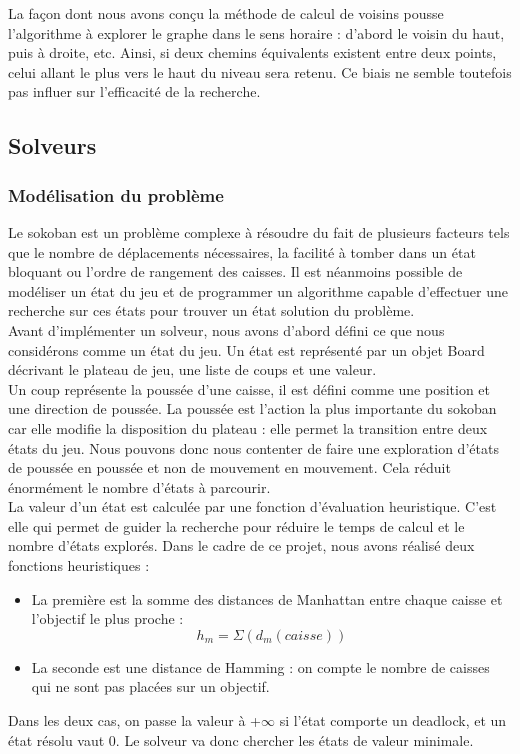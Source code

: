 \documentclass[a4paper,12pt]{article} %
\begin{document}
La façon dont nous avons conçu la méthode de calcul de voisins pousse l'algorithme à explorer le graphe dans le sens horaire : d'abord le voisin du haut, puis à droite, etc. Ainsi, si deux chemins équivalents existent entre deux points, celui allant le plus vers le haut du niveau sera retenu. Ce biais ne semble toutefois pas influer sur l'efficacité de la recherche.

\subsection{Solveurs}

\subsubsection{Modélisation du problème}

Le sokoban est un problème complexe à résoudre du fait de plusieurs facteurs tels que le nombre de déplacements nécessaires, la facilité à tomber dans un état bloquant ou l'ordre de rangement des caisses. Il est néanmoins possible de modéliser un état du jeu et de programmer un algorithme capable d'effectuer une recherche sur ces états pour trouver un état solution du problème.\\

Avant d'implémenter un solveur, nous avons d'abord défini ce que nous considérons comme un état du jeu. Un état est représenté par un objet Board décrivant le plateau de jeu, une liste de coups et une valeur.\\
Un coup représente la poussée d'une caisse, il est défini comme une position et une direction de poussée. La poussée est l'action la plus importante du sokoban car elle modifie la disposition du plateau : elle permet la transition entre deux états du jeu.
Nous pouvons donc nous contenter de faire une exploration d'états de poussée en poussée et non de mouvement en mouvement. Cela réduit énormément le nombre d'états à parcourir.\\
La valeur d'un état est calculée par une fonction d'évaluation heuristique. C'est elle qui permet de guider la recherche pour réduire le temps de calcul et le nombre d'états explorés. Dans le cadre de ce projet, nous avons réalisé deux fonctions heuristiques :\\
\begin{itemize}
\item La première est la somme des distances de Manhattan entre chaque caisse et l'objectif le plus proche : $$h_m= \Sigma(d_m(caisse))$$
\item La seconde est une distance de Hamming : on compte le nombre de caisses qui ne sont pas placées sur un objectif.
\end{itemize}
Dans les deux cas, on passe la valeur à +$\infty$ si l'état comporte un deadlock, et un état résolu vaut 0. Le solveur va donc chercher les états de valeur minimale.\\
\end{document}
